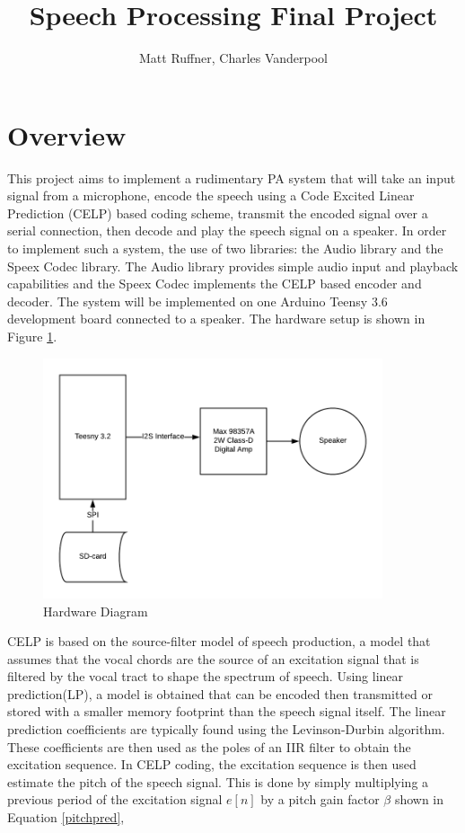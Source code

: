 \documentclass[letterpaper]{article}
\title{Speech Processing Final Project}
\author{Matt Ruffner, Charles Vanderpool}
\begin{document}
\maketitle

\section{Overview}

This project aims to implement a rudimentary PA system that will take an input signal from a microphone, encode the speech using a Code Excited Linear Prediction (CELP) based coding scheme, transmit the encoded signal over a serial connection, then decode and play the speech signal on a speaker. In order to implement such a system, the use of two libraries: the Audio library and the Speex Codec library. The Audio library provides simple audio input and playback capabilities and the Speex Codec implements the CELP based encoder and decoder. The system will be implemented on one Arduino Teensy 3.6 development board connected to a speaker. The hardware setup is shown in Figure \ref{hardware}.

\begin{figure}[h!]
    \centering
    \includegraphics[width=10cm]{hard}
    \caption{Hardware Diagram}
    \label{hardware}
\end{figure}


CELP is based on the source-filter model of speech production, a model that assumes that the vocal chords are the source of an excitation signal that is filtered by the vocal tract to shape the spectrum of speech. Using linear prediction(LP), a model is obtained that can be encoded then transmitted or stored with a smaller memory footprint than the speech signal itself. The linear prediction coefficients are typically found using the Levinson-Durbin algorithm. These coefficients are then used as the poles of an IIR filter to obtain the excitation sequence. In CELP coding, the excitation sequence is then used estimate the pitch of the speech signal. This is done by simply multiplying a previous period of the excitation signal $e[n]$ by a pitch gain factor $\beta$ shown in Equation \ref{pitchpred},
\end{document}
